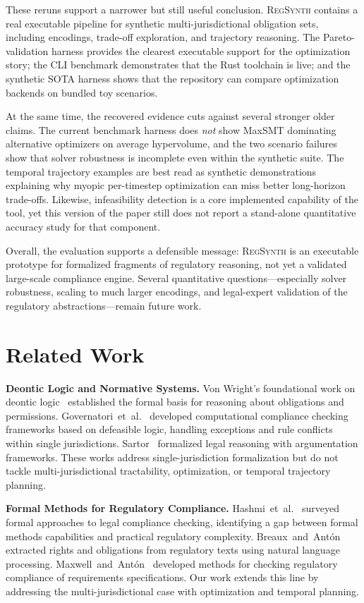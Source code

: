 \documentclass[11pt,twocolumn]{article}
\newcommand{\regsynth}{\textsc{RegSynth}}
\begin{document}
These reruns support a narrower but still useful conclusion. \regsynth{} contains a real executable pipeline for synthetic multi-jurisdictional obligation sets, including encodings, trade-off exploration, and trajectory reasoning. The Pareto-validation harness provides the clearest executable support for the optimization story; the CLI benchmark demonstrates that the Rust toolchain is live; and the synthetic SOTA harness shows that the repository can compare optimization backends on bundled toy scenarios.

At the same time, the recovered evidence cuts against several stronger older claims. The current benchmark harness does \emph{not} show MaxSMT dominating alternative optimizers on average hypervolume, and the two scenario failures show that solver robustness is incomplete even within the synthetic suite. The temporal trajectory examples are best read as synthetic demonstrations explaining why myopic per-timestep optimization can miss better long-horizon trade-offs. Likewise, infeasibility detection is a core implemented capability of the tool, yet this version of the paper still does not report a stand-alone quantitative accuracy study for that component.

Overall, the evaluation supports a defensible message: \regsynth{} is an executable prototype for formalized fragments of regulatory reasoning, not yet a validated large-scale compliance engine. Several quantitative questions---especially solver robustness, scaling to much larger encodings, and legal-expert validation of the regulatory abstractions---remain future work.

\section{Related Work}
\label{sec:related}

\textbf{Deontic Logic and Normative Systems.}
Von Wright's foundational work on deontic logic~\cite{vonwright1951} established
the formal basis for reasoning about obligations and permissions.
Governatori~et~al.~\cite{governatori2013compliance} developed computational
compliance checking frameworks based on defeasible logic, handling exceptions and
rule conflicts within single jurisdictions. Sartor~\cite{sartor2005legal}
formalized legal reasoning with argumentation frameworks.
These works address single-jurisdiction formalization but do not tackle
multi-jurisdictional tractability, optimization, or temporal trajectory planning.

\textbf{Formal Methods for Regulatory Compliance.}
Hashmi~et~al.~\cite{hashmi2018compliance} surveyed formal approaches to legal
compliance checking, identifying a gap between formal methods capabilities
and practical regulatory complexity.
Breaux~and~Antón~\cite{breaux2008analyzing} extracted rights and obligations from
regulatory texts using natural language processing.
Maxwell~and~Antón~\cite{maxwell2012checking} developed methods for checking
regulatory compliance of requirements specifications.
Our work extends this line by addressing the multi-jurisdictional case with
optimization and temporal planning.
\end{document}
